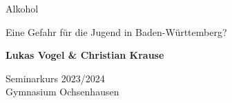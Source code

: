 
\begin{titlepage}
    \begin{center}
        \vspace*{1cm}
 
        {\huge{Alkohol}}
 
        \vspace{0.7cm}
         {\Large Eine Gefahr für die Jugend in Baden-Württemberg?}
             
        \vspace{1cm}
 
        \textbf{Lukas Vogel \& Christian Krause}
              
             
        \vfill
        \large
        Seminarkurs 2023/2024\\
        Gymnasium Ochsenhausen\\
             
    \end{center}
 \end{titlepage}